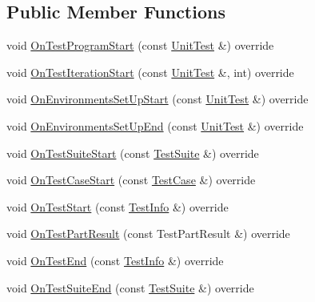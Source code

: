 \subsection*{Public Member Functions}
\begin{DoxyCompactItemize}
\item 
void \mbox{\hyperlink{classtesting_1_1_empty_test_event_listener_ac3f5033fcd82080edb45f546ce9854fe}{On\+Test\+Program\+Start}} (const \mbox{\hyperlink{classtesting_1_1_unit_test}{Unit\+Test}} \&) override
\item 
void \mbox{\hyperlink{classtesting_1_1_empty_test_event_listener_a31edf103561e8b4d747656bc2d927661}{On\+Test\+Iteration\+Start}} (const \mbox{\hyperlink{classtesting_1_1_unit_test}{Unit\+Test}} \&, int) override
\item 
void \mbox{\hyperlink{classtesting_1_1_empty_test_event_listener_a6e498ae763ac8c1a46bd861e0b7ff3f5}{On\+Environments\+Set\+Up\+Start}} (const \mbox{\hyperlink{classtesting_1_1_unit_test}{Unit\+Test}} \&) override
\item 
void \mbox{\hyperlink{classtesting_1_1_empty_test_event_listener_a9b4e781c0b38065a55c2fd163724ba69}{On\+Environments\+Set\+Up\+End}} (const \mbox{\hyperlink{classtesting_1_1_unit_test}{Unit\+Test}} \&) override
\item 
void \mbox{\hyperlink{classtesting_1_1_empty_test_event_listener_a1e32e4bd4857822b6b50e6900aa5c651}{On\+Test\+Suite\+Start}} (const \mbox{\hyperlink{classtesting_1_1_test_suite}{Test\+Suite}} \&) override
\item 
void \mbox{\hyperlink{classtesting_1_1_empty_test_event_listener_a7f9a84967fde01000b7a56e9e84b6052}{On\+Test\+Case\+Start}} (const \mbox{\hyperlink{classtesting_1_1_test_case}{Test\+Case}} \&) override
\item 
void \mbox{\hyperlink{classtesting_1_1_empty_test_event_listener_a1d8c7f3f1f92826f668edae1bc5aadf4}{On\+Test\+Start}} (const \mbox{\hyperlink{classtesting_1_1_test_info}{Test\+Info}} \&) override
\item 
void \mbox{\hyperlink{classtesting_1_1_empty_test_event_listener_ab95992f0a0b3741d59a24c3a7115fa60}{On\+Test\+Part\+Result}} (const Test\+Part\+Result \&) override
\item 
void \mbox{\hyperlink{classtesting_1_1_empty_test_event_listener_a709d7077c086c877d214231bc520ef90}{On\+Test\+End}} (const \mbox{\hyperlink{classtesting_1_1_test_info}{Test\+Info}} \&) override
\item 
void \mbox{\hyperlink{classtesting_1_1_empty_test_event_listener_aefdb73682d290791461e186d864db718}{On\+Test\+Suite\+End}} (const \mbox{\hyperlink{classtesting_1_1_test_suite}{Test\+Suite}} \&) override

\end{DoxyCompactItemize}
